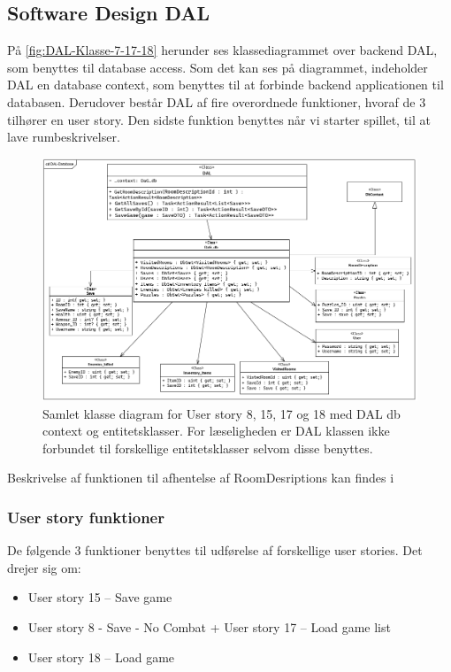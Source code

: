 \subsection{Software Design DAL}
På \autoref{fig:DAL-Klasse-7-17-18} herunder ses klassediagrammet over backend DAL, som benyttes til database access. 
Som det kan ses på diagrammet, indeholder DAL en database context, som benyttes til at forbinde backend applicationen til databasen. 
Derudover består DAL af fire overordnede funktioner, hvoraf de 3 tilhører en user story. 
Den sidste funktion benyttes når vi starter spillet, til at lave rumbeskrivelser.\\

\begin{figure}[H]
\centering
\includegraphics[width = \textwidth]{02-Body/Images/DAL-Database/DAL-DB-CD.PNG}
\caption{Samlet klasse diagram for User story 8, 15, 17 og 18 med DAL db context og entitetsklasser.
For læseligheden er DAL klassen ikke forbundet til forskellige entitetsklasser selvom disse benyttes.}
\label{fig:DAL-Klasse-7-17-18}
\end{figure}

Beskrivelse af funktionen til afhentelse af RoomDesriptions kan findes i 

\subsubsection{User story funktioner}
De følgende 3 funktioner benyttes til udførelse af forskellige user stories.
Det drejer sig om:
\begin{itemize}
\item User story 15 – Save game
\item User story 8 - Save - No Combat  + User story 17 – Load game list 
\item User story 18 – Load game \\
\end{itemize}

